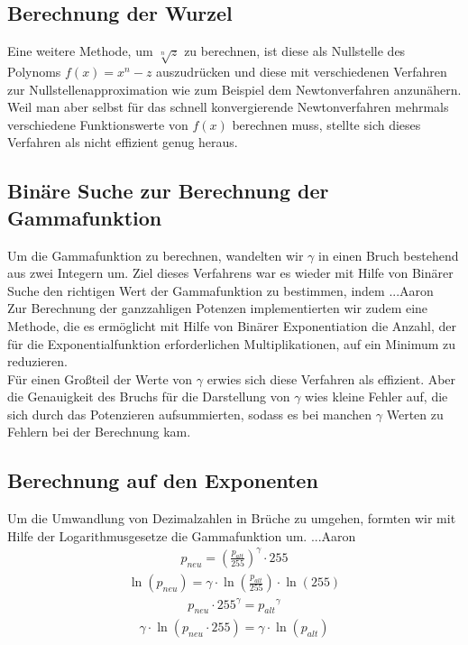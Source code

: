 \documentclass[course=erap]{aspdoc}
\begin{document}
\subsection{Berechnung der Wurzel}
Eine weitere Methode, um $\sqrt[n]{z}$ zu berechnen, ist diese als Nullstelle des Polynoms $f(x)=x^n-z$ auszudrücken und diese mit verschiedenen Verfahren zur Nullstellenapproximation wie zum Beispiel dem Newtonverfahren anzunähern. Weil man aber selbst für das schnell konvergierende Newtonverfahren mehrmals verschiedene Funktionswerte von $f(x)$ berechnen muss, stellte sich dieses Verfahren als nicht effizient genug heraus.     

\subsection{Binäre Suche zur Berechnung der Gammafunktion}
Um die Gammafunktion zu berechnen, wandelten wir  $\gamma$ in einen Bruch bestehend aus zwei Integern um. Ziel dieses Verfahrens war es wieder mit Hilfe von Binärer Suche den richtigen Wert der Gammafunktion zu bestimmen, indem ...Aaron
\\
\newline
\noindent	
Zur Berechnung der ganzzahligen Potenzen implementierten wir zudem eine Methode, die es ermöglicht mit Hilfe von Binärer Exponentiation die Anzahl, der für die Exponentialfunktion erforderlichen Multiplikationen, auf ein Minimum zu reduzieren. 
\\
\newline
\noindent		 
Für einen Großteil der Werte von $\gamma$ erwies sich diese Verfahren als effizient. Aber die Genauigkeit des Bruchs für die Darstellung von $\gamma$ wies kleine Fehler auf, die sich durch das Potenzieren aufsummierten, sodass es bei manchen $\gamma$ Werten zu Fehlern bei der Berechnung kam.       

\subsection{Berechnung auf den Exponenten}
Um die Umwandlung von Dezimalzahlen in Brüche zu umgehen, formten wir mit Hilfe der Logarithmusgesetze die Gammafunktion um. ...Aaron
\begin{align}	
p_{neu} = \left(\frac{p_{alt}}{255}\right)^{\gamma} \cdot 255
\end{align}
\begin{align}	
\ln (p_{neu}) = \gamma \cdot \ln\left(\frac{p_{alt}}{255}\right) \cdot \ln(255)
\end{align}
\begin{align}
p_{neu} \cdot 255^\gamma = {p_{alt}}^{\gamma}
\end{align}
\begin{align}
\gamma \cdot \ln ( p_{neu} \cdot 255) = \gamma \cdot \ln({p_{alt}})
\end{align}
\end{document}
